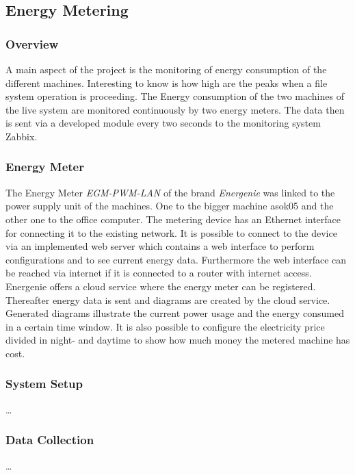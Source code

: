 \subsection{Energy Metering}

\subsubsection{Overview}
A main aspect of the project is the monitoring of energy consumption of the different machines. Interesting to know is how high are the peaks when a file system operation is proceeding. The Energy consumption of the two machines of the live system are monitored continuously by two energy meters. The data then is sent via a developed module every two seconds to the monitoring system Zabbix.

\subsubsection{Energy Meter}
The Energy Meter \textit{EGM-PWM-LAN} of the brand \textit{Energenie} was linked to the power supply unit of the machines. One to the bigger machine asok05 and the other one to the office computer. The metering device has an Ethernet interface for connecting it to the existing network. It is possible to connect to the device via an implemented web server which contains a web interface to perform configurations and to see current energy data. Furthermore the web interface can be reached via internet if it is connected to a router with internet access. Energenie offers a cloud service \cite{Energenie.2014} where the energy meter can be registered. Thereafter energy data is sent and diagrams are created by the cloud service. Generated diagrams illustrate the current power usage and the energy consumed in a certain time window. It is also possible to configure the electricity price divided in night- and daytime to show how much money the metered machine has cost.

\subsubsection{System Setup}
\dots


\subsubsection{Data Collection}
\dots
